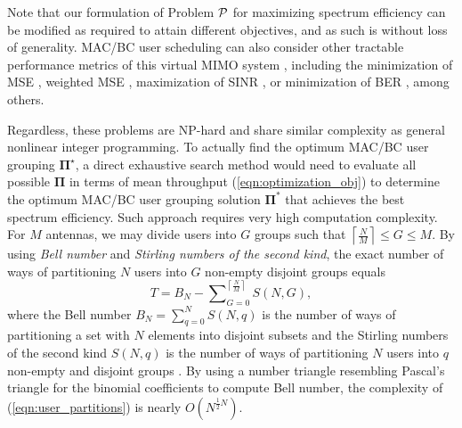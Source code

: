 Note that our formulation of Problem ${\cal P}$ for maximizing spectrum efficiency can be modified as required to attain different objectives, and as such is without loss of generality. 
MAC/BC user scheduling can also consider other tractable performance metrics of this virtual MIMO system \cite{Palomar03}, including the minimization of MSE \cite{Mo09, Lee76}, weighted MSE \cite{Sampath01}, maximization of SINR \cite{Scaglione99}, or minimization of BER \cite{Palomar05},
among others. 

Regardless, these problems are NP-hard and share similar complexity as general nonlinear integer programming. 
To actually find the optimum MAC/BC user grouping ${\bm{\Pi}^{\star}}$, a direct exhaustive search method would need to evaluate all possible $\bm{\Pi}$ in terms of mean throughput (\ref{eqn:optimization_obj}) to determine the optimum MAC/BC user grouping solution $\bm{\Pi}^\ast$ that achieves the 
best spectrum efficiency. 
Such approach requires very high computation complexity. 
For $M$ antennas, we may divide users
into $G$ groups such that $\left\lceil {\frac{N}{M}} \right\rceil  \le G
\le M$. By using \emph{Bell number} and \emph{Stirling numbers of the second kind}, 
the exact number of ways of partitioning $N$ users into $G$ non-empty disjoint groups equals
\begin{equation}
	T = {B_N} - \sum\nolimits_{G = 0}^{\left\lceil {\frac{N}{M}} \right\rceil }{S(N, G)},\label{eqn:user_partitions}
\end{equation}
where the Bell number ${B_N} = \sum\nolimits_{q = 0}^N S(N, q)$ is the number of ways of partitioning a set with $N$ elements into disjoint subsets and the Stirling numbers of the second kind $S(N, q)$ is the number of ways of partitioning $N$ users into $q$ non-empty and disjoint groups \cite{Riordan80}. By using a number triangle resembling Pascal's triangle for the binomial coefficients to compute Bell number, the complexity of (\ref{eqn:user_partitions}) is nearly $O(N^{\frac{1}{2}N})$\cite{Aitken33}.

